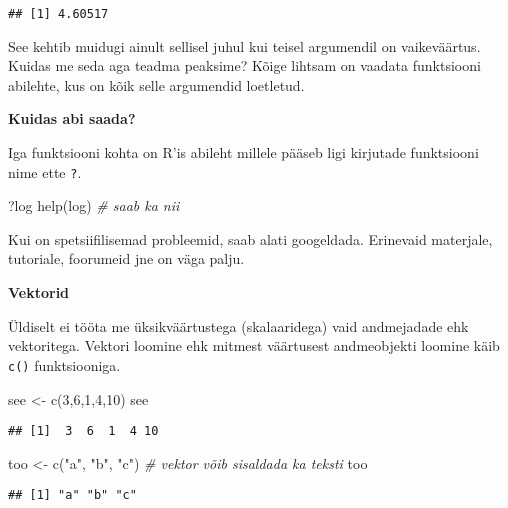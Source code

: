 \documentclass[
]{book}
\newenvironment{Shaded}{\begin{snugshade}}{\end{snugshade}}
\newcommand{\CommentTok}[1]{\textcolor[rgb]{0.56,0.35,0.01}{\textit{#1}}}
\newcommand{\DecValTok}[1]{\textcolor[rgb]{0.00,0.00,0.81}{#1}}
\newcommand{\FunctionTok}[1]{\textcolor[rgb]{0.00,0.00,0.00}{#1}}
\newcommand{\NormalTok}[1]{#1}
\newcommand{\OtherTok}[1]{\textcolor[rgb]{0.56,0.35,0.01}{#1}}
\newcommand{\StringTok}[1]{\textcolor[rgb]{0.31,0.60,0.02}{#1}}
\begin{document}
\begin{verbatim}
## [1] 4.60517
\end{verbatim}

See kehtib muidugi ainult sellisel juhul kui teisel argumendil on vaikeväärtus. Kuidas me seda aga teadma peaksime? Kõige lihtsam on vaadata funktsiooni abilehte, kus on kõik selle argumendid loetletud.

\textbf{Kuidas abi saada?}

Iga funktsiooni kohta on R'is abileht millele pääseb ligi kirjutade funktsiooni nime ette \texttt{?}.

\begin{Shaded}
\begin{Highlighting}[]
\NormalTok{?log}
\FunctionTok{help}\NormalTok{(log) }\CommentTok{\# saab ka nii}
\end{Highlighting}
\end{Shaded}

Kui on spetsiifilisemad probleemid, saab alati googeldada. Erinevaid materjale, tutoriale, foorumeid jne on väga palju.

\textbf{Vektorid}

Üldiselt ei tööta me üksikväärtustega (skalaaridega) vaid andmejadade ehk vektoritega. Vektori loomine ehk mitmest väärtusest andmeobjekti loomine käib \texttt{c()} funktsiooniga.

\begin{Shaded}
\begin{Highlighting}[]
\NormalTok{see }\OtherTok{\textless{}{-}} \FunctionTok{c}\NormalTok{(}\DecValTok{3}\NormalTok{,}\DecValTok{6}\NormalTok{,}\DecValTok{1}\NormalTok{,}\DecValTok{4}\NormalTok{,}\DecValTok{10}\NormalTok{)}
\NormalTok{see}
\end{Highlighting}
\end{Shaded}

\begin{verbatim}
## [1]  3  6  1  4 10
\end{verbatim}

\begin{Shaded}
\begin{Highlighting}[]
\NormalTok{too }\OtherTok{\textless{}{-}} \FunctionTok{c}\NormalTok{(}\StringTok{"a"}\NormalTok{, }\StringTok{"b"}\NormalTok{, }\StringTok{"c"}\NormalTok{) }\CommentTok{\# vektor võib sisaldada ka teksti}
\NormalTok{too}
\end{Highlighting}
\end{Shaded}

\begin{verbatim}
## [1] "a" "b" "c"
\end{verbatim}
\end{document}
